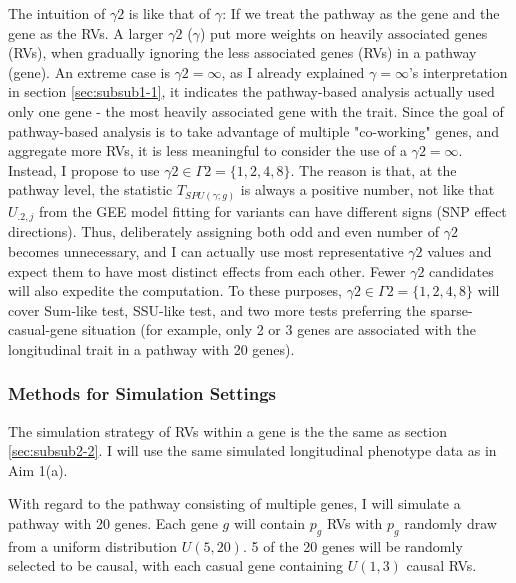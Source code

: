 \documentclass[12pt]{article}
\begin{document}
The intuition of $\gamma 2$ is like that of $\gamma$: If we treat the pathway as the gene and the gene as the RVs. A larger $\gamma 2$ ($\gamma$) put more weights on heavily associated genes (RVs), when gradually ignoring the less associated genes (RVs) in a pathway (gene). An extreme case is $\gamma 2 = \infty$, as I already explained $\gamma = \infty$'s interpretation in section \ref{sec:subsub1-1}, it indicates the pathway-based analysis actually used only one gene - the most heavily associated gene with the trait. Since the goal of pathway-based analysis is to take advantage of multiple "co-working" genes, and aggregate more RVs, it is less meaningful to consider the use of a $\gamma 2= \infty$. Instead, I propose to use $\gamma 2 \in \Gamma 2 = \{1,2,4,8\}$. The reason is that, at the pathway level, the statistic $T_ { SPU(\gamma ; g) }$ is always a positive number, not like that $U_{.2,j}$ from the GEE model fitting for variants can have different signs (SNP effect directions). Thus, deliberately assigning both odd and even number of $\gamma 2$ becomes unnecessary, and I can actually use most representative $\gamma 2$ values and expect them to have most distinct effects from each other. Fewer $\gamma 2$ candidates will also expedite the computation. To these purposes, $\gamma 2 \in \Gamma 2 = \{1,2,4,8\}$ will cover Sum-like test, SSU-like test, and two more tests preferring the sparse-casual-gene situation (for example, only 2 or 3 genes are associated with the longitudinal trait in a pathway with 20 genes). 

\subsubsection{Methods for Simulation Settings}\label{sec:aim2-2}
The simulation strategy of RVs within a gene is the the same as section \ref{sec:subsub2-2}. I will use the same simulated longitudinal phenotype data as in Aim 1(a).

With regard to the pathway consisting of multiple genes, I will simulate a pathway with 20 genes. Each gene $g$ will contain $p_g$ RVs with $p_g$ randomly draw from a uniform distribution $U(5,20)$. 5 of the 20 genes will be randomly selected to be causal, with each casual gene containing $U(1,3)$ causal RVs.

\end{document}
